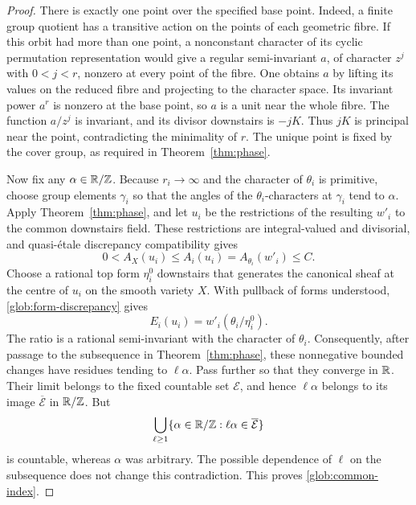 \begin{proof}
There is exactly one point over the specified base point.  Indeed, a
finite group quotient has a transitive action on the points of each
geometric fibre.  If this orbit had more than one point, a nonconstant
character of its cyclic permutation representation would give a regular
semi-invariant $a$, of character $z^j$ with $0<j<r$, nonzero at every point
of the fibre.  One obtains $a$ by lifting its values on the reduced fibre
and projecting to the character space.  Its invariant power $a^r$ is
nonzero at the base point, so $a$ is a unit near the whole fibre.  The
function $a/z^j$ is invariant, and its divisor downstairs is $-jK$.
Thus $jK$ is principal near the point, contradicting the minimality of
$r$.  The unique point is fixed by the cover group, as required in
Theorem~\ref{thm:phase}.

Now fix any $\alpha\in\mathbb R/\mathbb Z$.  Because $r_i\to\infty$ and the character of
$\theta_i$ is primitive, choose group elements $\gamma_i$ so that the
angles of the $\theta_i$-characters at $\gamma_i$ tend to $\alpha$.
Apply Theorem~\ref{thm:phase}, and let $u_i$ be the restrictions of the
resulting $w'_i$ to the common downstairs field.  These restrictions are
integral-valued and divisorial, and quasi-\'etale discrepancy compatibility
gives
\[
 0<A_X(u_i)\leq A_i(u_i)=A_{\theta_i}(w'_i)\leq C.
\]
Choose a rational top form $\eta_i^0$ downstairs that generates the
canonical sheaf at the centre of $u_i$ on the smooth variety $X$.  With
pullback of forms understood, \eqref{glob:form-discrepancy} gives
\begin{equation}\label{glob:phase-change}
 E_i(u_i)=w'_i(\theta_i/\eta_i^0).
\end{equation}
The ratio is a rational semi-invariant with the character of $\theta_i$.
Consequently, after passage to the subsequence in
Theorem~\ref{thm:phase}, these nonnegative bounded changes have residues
tending to $\ell\alpha$.  Pass further so that they converge in $\mathbb R$.
Their limit belongs to the fixed countable set $\mathscr E$, and hence
$\ell\alpha$ belongs to its image $\overline{\mathscr E}$ in $\mathbb R/\mathbb Z$.
But
\[
 \bigcup_{\ell\geq1}\{\alpha\in\mathbb R/\mathbb Z:
                  \ell\alpha\in\overline{\mathcal E}\}
\]
is countable, whereas $\alpha$ was arbitrary.  The possible dependence of
$\ell$ on the subsequence does not change this contradiction.  This proves
\eqref{glob:common-index}.


\end{proof}
